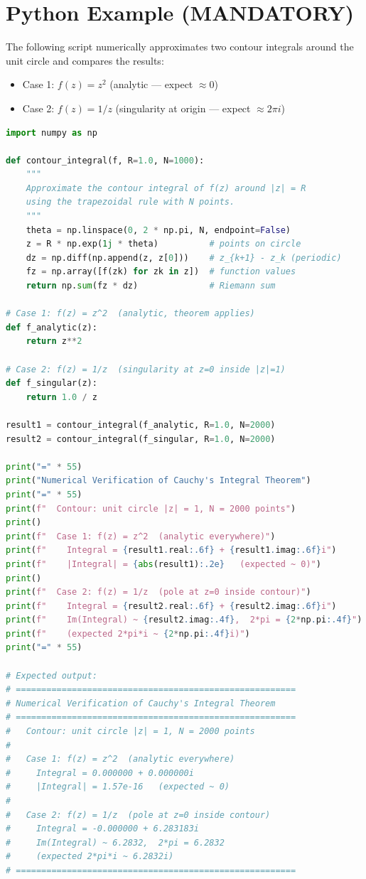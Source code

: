 \documentclass[12pt,a4paper]{article}
\begin{document}
\section{Python Example (MANDATORY)}

The following script numerically approximates two contour integrals around the unit circle
and compares the results:
\begin{itemize}
  \item Case 1: $f(z) = z^2$ (analytic --- expect $\approx 0$)
  \item Case 2: $f(z) = 1/z$ (singularity at origin --- expect $\approx 2\pi i$)
\end{itemize}

\begin{lstlisting}[language=Python, caption={Numerical verification of Cauchy's Integral Theorem}]
import numpy as np

def contour_integral(f, R=1.0, N=1000):
    """
    Approximate the contour integral of f(z) around |z| = R
    using the trapezoidal rule with N points.
    """
    theta = np.linspace(0, 2 * np.pi, N, endpoint=False)
    z = R * np.exp(1j * theta)          # points on circle
    dz = np.diff(np.append(z, z[0]))    # z_{k+1} - z_k (periodic)
    fz = np.array([f(zk) for zk in z])  # function values
    return np.sum(fz * dz)              # Riemann sum

# Case 1: f(z) = z^2  (analytic, theorem applies)
def f_analytic(z):
    return z**2

# Case 2: f(z) = 1/z  (singularity at z=0 inside |z|=1)
def f_singular(z):
    return 1.0 / z

result1 = contour_integral(f_analytic, R=1.0, N=2000)
result2 = contour_integral(f_singular, R=1.0, N=2000)

print("=" * 55)
print("Numerical Verification of Cauchy's Integral Theorem")
print("=" * 55)
print(f"  Contour: unit circle |z| = 1, N = 2000 points")
print()
print(f"  Case 1: f(z) = z^2  (analytic everywhere)")
print(f"    Integral = {result1.real:.6f} + {result1.imag:.6f}i")
print(f"    |Integral| = {abs(result1):.2e}   (expected ~ 0)")
print()
print(f"  Case 2: f(z) = 1/z  (pole at z=0 inside contour)")
print(f"    Integral = {result2.real:.6f} + {result2.imag:.6f}i")
print(f"    Im(Integral) ~ {result2.imag:.4f},  2*pi = {2*np.pi:.4f}")
print(f"    (expected 2*pi*i ~ {2*np.pi:.4f}i)")
print("=" * 55)

# Expected output:
# =======================================================
# Numerical Verification of Cauchy's Integral Theorem
# =======================================================
#   Contour: unit circle |z| = 1, N = 2000 points
#
#   Case 1: f(z) = z^2  (analytic everywhere)
#     Integral = 0.000000 + 0.000000i
#     |Integral| = 1.57e-16   (expected ~ 0)
#
#   Case 2: f(z) = 1/z  (pole at z=0 inside contour)
#     Integral = -0.000000 + 6.283183i
#     Im(Integral) ~ 6.2832,  2*pi = 6.2832
#     (expected 2*pi*i ~ 6.2832i)
# =======================================================
\end{lstlisting}
\end{document}

